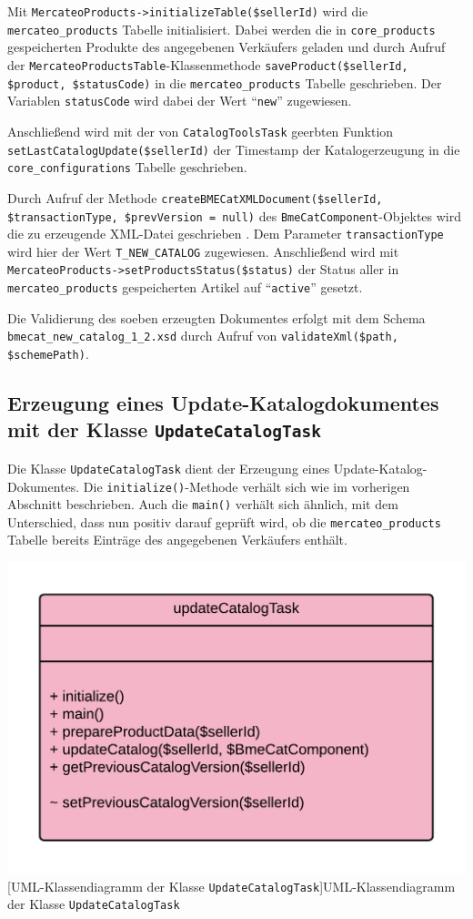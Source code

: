 {	
	Mit \texttt{MercateoProducts->initializeTable(\$sellerId)} wird die \texttt{mercateo\_products} Tabelle initialisiert. Dabei werden die in \texttt{core\_products} gespeicherten Produkte des angegebenen Verkäufers geladen und durch Aufruf der \texttt{MercateoProductsTable}-Klassenmethode  \texttt{saveProduct(\$sellerId, \$product, \$statusCode)} in die \texttt{mercateo\_products} Tabelle geschrieben. Der Variablen \texttt{statusCode} wird dabei der Wert \enquote{\texttt{new}} zugewiesen. 
	
	Anschließend wird mit der von \texttt{CatalogToolsTask} geerbten Funktion \texttt{setLastCatalogUpdate(\$sellerId)} der Timestamp der Katalogerzeugung in die \texttt{core\_configurations} Tabelle geschrieben.
		
	Durch Aufruf der Methode \texttt{createBMECatXMLDocument(\$sellerId, \$transactionType, \$prevVersion = null)} des \texttt{BmeCatComponent}-Objektes wird die zu erzeugende XML-Datei geschrieben . Dem Parameter \texttt{transactionType} wird hier der Wert \texttt{T\_NEW\_CATALOG} zugewiesen. Anschließend wird mit \texttt{Mercateo\-Products->setProductsStatus(\$status)}  der Status aller in \texttt{mercateo\_products} gespeicherten Artikel auf \enquote{\texttt{active}} gesetzt.

	Die Validierung des soeben erzeugten Dokumentes erfolgt mit dem Schema \texttt{bmecat\_new\_catalog\_1\_2.xsd} durch Aufruf von \texttt{validateXml(\$path, \$schemePath)}.
	
	
	
	\subsection{Erzeugung eines Update-Katalogdokumentes  mit der Klasse \texttt{UpdateCatalogTask}}
	
	Die Klasse \texttt{UpdateCatalogTask} dient der Erzeugung eines Update-Katalog-Dokumentes. Die \texttt{initialize()}-Methode verhält sich wie im vorherigen Abschnitt beschrieben. Auch die \texttt{main()} verhält sich ähnlich, mit dem Unterschied, dass nun positiv darauf geprüft wird, ob die \texttt{mercateo\_products} Tabelle bereits Einträge des angegebenen Verkäufers enthält. \\
	\begin{minipage}{\linewidth}
		\vspace{1em}
		\centering
		\includegraphics[width=0.6 \linewidth]{img/UpdateCatalogTaskUML}
		[UML-Klassendiagramm der Klasse \texttt{UpdateCatalogTask}]{UML-Klassendiagramm der Klasse \texttt{UpdateCatalogTask}}
		\vspace{1em}
	\end{minipage}
	
}
